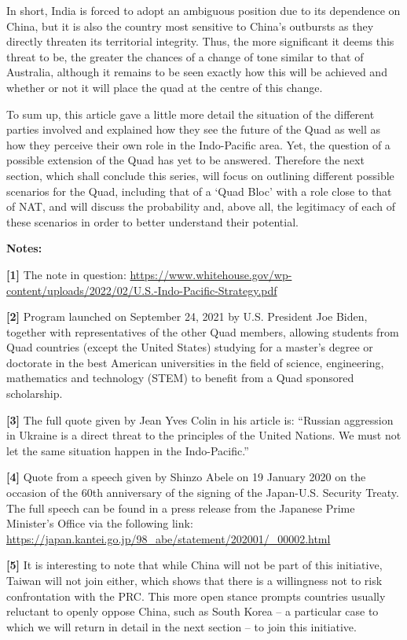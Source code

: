 \documentclass[11pt,a4paper]{article}
\begin{document}
In short, India is forced to adopt an ambiguous position due to its dependence on China, but it is also the country most sensitive to China’s outbursts as they directly threaten its territorial integrity. Thus, the more significant it deems this threat to be, the greater the chances of a change of tone similar to that of Australia, although it remains to be seen exactly how this will be achieved and whether or not it will place the quad at the centre of this change.

To sum up, this article gave a little more detail the situation of the different parties involved and explained how they see the future of the Quad as well as how they perceive their own role in the Indo-Pacific area. Yet, the question of a possible extension of the Quad has yet to be answered. Therefore the next section, which shall conclude this series, will focus on outlining different possible scenarios for the Quad, including that of a ‘Quad Bloc’ with a role close to that of NAT, and will discuss the probability and, above all, the legitimacy of each of these scenarios in order to better understand their potential.

\textbf{Notes:}

\textbf{{[}1{]}} The note in question: \url{https://www.whitehouse.gov/wp-content/uploads/2022/02/U.S.-Indo-Pacific-Strategy.pdf}

\textbf{{[}2{]}} Program launched on September 24, 2021 by U.S. President Joe Biden, together with representatives of the other Quad members, allowing students from Quad countries (except the United States) studying for a master’s degree or doctorate in the best American universities in the field of science, engineering, mathematics and technology (STEM) to benefit from a Quad sponsored scholarship.

\textbf{{[}3{]}} The full quote given by Jean Yves Colin in his article is: “Russian aggression in Ukraine is a direct threat to the principles of the United Nations. We must not let the same situation happen in the Indo-Pacific.”

\textbf{{[}4{]}} Quote from a speech given by Shinzo Abele on 19 January 2020 on the occasion of the 60th anniversary of the signing of the Japan-U.S. Security Treaty. The full speech can be found in a press release from the Japanese Prime Minister’s Office via the following link: \url{https://japan.kantei.go.jp/98_abe/statement/202001/_00002.html}

\textbf{{[}5{]}} It is interesting to note that while China will not be part of this initiative, Taiwan will not join either, which shows that there is a willingness not to risk confrontation with the PRC. This more open stance prompts countries usually reluctant to openly oppose China, such as South Korea – a particular case to which we will return in detail in the next section – to join this initiative.
\end{document}
